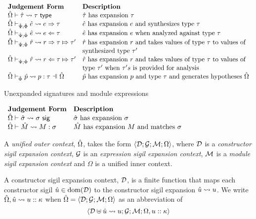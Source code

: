 \vspace{10px}
$\begin{array}{ll}
\textbf{Judgement Form} & \textbf{Description}\\
\tExpandsPX{\utau}{\tau} & \text{$\utau$ has expansion $\tau$}\\
\esynPX{\ue}{e}{\tau} & \text{$\ue$ has expansion $e$ and synthesizes type $\tau$}\\
\eanaPX{\ue}{e}{\tau} & \text{$\ue$ has expansion $e$ when analyzed against type $\tau$}\\
\rsynPX{\urv}{r}{\tau}{\tau'} & \text{$\urv$ has expansion $r$ and takes values of type $\tau$ to values of}\\
& \text{synthesized type $\tau'$}\\
\ranaPX{\urv}{r}{\tau}{\tau'} & \text{$\urv$ has expansion $r$ and takes values of type $\tau$ to values of}\\
& \text{type $\tau'$ when $\tau's$ is provided for analysis}\\
\patExpandsP{\uOmega}{\uPhi}{\upv}{p}{\tau} & \text{$\upv$ has expansion $p$ and type $\tau$ and generates hypotheses $\uOmega$}
\end{array}$
\vspace{10px}

Unexpanded signatures and module expressions

\vspace{10px}
$\begin{array}{ll}
\textbf{Judgement Form} & \textbf{Description}\\
{\hat\Omega} \vdash {\hat\sigma} \leadsto \sigma~\mathsf{sig} & \text{${\hat\sigma}$ has expansion $\sigma$}\\
{\hat\Omega} \vdash {\hat M} \leadsto M : \sigma & \text{${\hat M}$ has expansion $M$ and matches $\sigma$}
\end{array}$
\vspace{10px}

A \emph{unified outer context}, ${\hat\Omega}$, takes the form $\langle \mathcal{D}; \mathcal{G}; \mathcal{M}; \Omega \rangle$, where $\mathcal{D}$ is a \emph{constructor sigil expansion context}, $\mathcal{G}$ is an \emph{expression sigil expansion context}, $\mathcal{M}$ is a \emph{module sigil expansion context} and $\Omega$ is a unified inner context.

A constructor sigil expansion context, $\mathcal{D}$, is a finite function that maps each constructor sigil ${\hat u} \in \text{dom}(\mathcal{D})$ to the constructor sigil expansion ${\hat u} \leadsto u$. We write ${\hat\Omega}, {\hat u} \leadsto u :: \kappa$ when ${\hat\Omega}=\langle \mathcal{D}; \mathcal{G}; \mathcal{M}; \Omega \rangle$ as an abbreviation of \[\langle \mathcal{D} \uplus {\hat u} \leadsto u; \mathcal{G}; \mathcal{M}; \Omega, u :: \kappa \rangle\]


